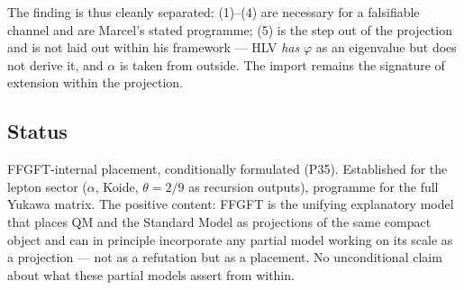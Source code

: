 The finding is thus cleanly separated: (1)--(4) are necessary for a falsifiable
channel and are Marcel's stated programme; (5) is the step out of the
projection and is not laid out within his framework --- HLV \emph{has}
$\varphi$ as an eigenvalue but does not derive it, and $\alpha$ is taken from
outside. The import remains the signature of extension within the projection.

\subsection*{Status}

FFGFT-internal placement, conditionally formulated (P35). Established for the
lepton sector ($\alpha$, Koide, $\theta = 2/9$ as recursion outputs),
programme for the full Yukawa matrix. The positive content: FFGFT is the
unifying explanatory model that places QM and the Standard Model as
projections of the same compact object and can in principle incorporate any
partial model working on its scale as a projection --- not as a refutation but
as a placement. No unconditional claim about what these partial models assert
from within.
